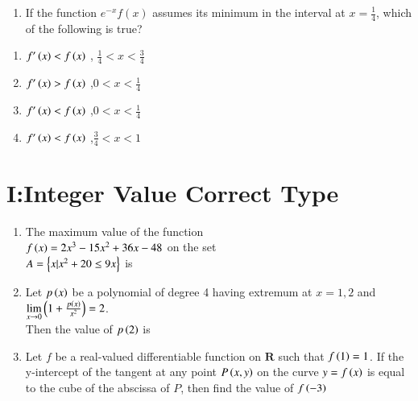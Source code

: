 \documentclass[journal,,12pt,onecolumn]{IEEEtran}
\theoremstyle{remark}
\begin{document}
\begin{enumerate}
\begin{enumerate}
\end{enumerate}


\item If the function $e^{-x}f(x)$ assumes its minimum in the interval  at $x=\frac{1}{4}$, which of the following is true?
\end{enumerate}

\hfill{}

\begin{enumerate}

\item $f'\left(x\right)<f\left(x\right)$ , $\frac{1}{4}<x<\frac{3}{4}$ \\

\item $f'\left(x\right)>f\left(x\right)$ ,$0<x<\frac{1}{4}$ \\ 

\item $f'\left(x\right)<f\left(x\right)$ ,$0<x<\frac{1}{4}$ \\

\item $f'\left(x\right)<f\left(x\right)$ ,$\frac{3}{4}<x<1$ \\


\end{enumerate}


\section*{I:Integer Value Correct Type}

\begin{enumerate}
\item The maximum value of the function \\
$f\left(x\right)=2x^3-15x^2+36x-48$ on the set\\
$A=\left\{x|x^2+20 \le 9x\right\}$ is

\hfill {}

\item Let $p\left(x\right)$ be a polynomial of degree 4 having extremum at $x=1,2 $ and $\lim \limits_{x\to 0} \left(1+\frac{p\left(x\right)}{x^2}\right) = 2$.\\
Then the value of $p\left(2\right)$ is
\hfill {}
\item Let $f$ be a real-valued differentiable function on $\textbf{R}$ such that $f\left(1\right)=1$. If the y-intercept of the tangent at any point $P\left(x,y\right)$ on the curve $y=f\left(x\right)$ is equal to the cube of the abscissa of $P$, then find the value of $f\left(-3\right)$

    \hfill {}


\end{enumerate}
\end{document}
